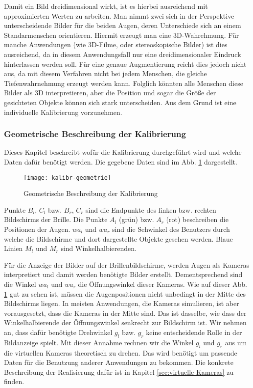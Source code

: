 Damit ein Bild dreidimensional wirkt, ist es hierbei ausreichend mit approximierten Werten zu arbeiten.
Man nimmt zwei sich in der Perspektive unterscheidende Bilder für die beiden Augen, deren Unterschiede sich an einem Standarmenschen orientieren. 
Hiermit erzeugt man eine 3D-Wahrehmung. 
Für manche Anwendungen (wie 3D-Filme, oder stereoskopische Bilder) ist dies ausreichend, da in diesem Anwendungsfall nur eine dreidimensionaler Eindruck hinterlassen werden soll. 
Für eine genaue Augmentierung reicht dies jedoch nicht aus, da mit diesem Verfahren nicht bei jedem Menschen, die gleiche Tiefenwahrnehmung erzeugt werden kann.
Folglich könnten alle Menschen diese Bilder als 3D interpretieren, aber die Position und sogar die Größe der gesichteten Objekte können sich stark unterscheiden. 
Aus dem Grund ist eine individuelle Kalibrierung vorzunehmen.


\subsubsection{Geometrische Beschreibung der Kalibrierung}
\label{sec:Geometrische Beschreibung der Kalibrierung}
Dieses Kapitel beschreibt wofür die Kalibrierung durchgeführt wird und welche Daten dafür benötigt werden.
Die gegebene Daten sind im Abb. \ref{fig:geom} dargestellt. 

\begin{figure}[h]
   \centering
   \texttt{[image: kalibr-geometrie]}
   \caption{Geometrische Beschreibung der Kalibrierung}
   \label{fig:geom}
\end{figure}

Punkte $B_{l}$, $C_{l}$ bzw. $B_{r}$, $C_{r}$ sind die Endpunkte des linken bzw. rechten Bildschirms der Brille.
Die Punkte $A_{l}$ (grün) bzw. $A_{r}$ (rot) beschreiben die Positionen der Augen.
$wa_{l}$ und $wa_{r}$ sind die Sehwinkel des Benutzers durch welche die Bildschirme und dort dargestellte Objekte gesehen werden. 
Blaue Linien $M_{l}$ und $M_{r}$ sind Winkelhalbierenden.

Für die Anzeige der Bilder auf der Brillenbildschirme, werden Augen als Kameras interpretiert und damit werden benötigte Bilder erstellt.
Dementsprechend sind die Winkel $wa_{l}$ und $wa_{r}$ die Öffnungswinkel dieser Kameras.
Wie auf dieser Abb. \ref{fig:geom} gut zu sehen ist, müssen die Augenpositionen nicht unbedingt in der Mitte des Bildschirms liegen.
In meisten Anwendungen, die Kameras simulieren, ist aber vorausgesetzt, dass die Kameras in der Mitte sind.
Das ist dasselbe, wie dass der Winkelhalbierende der Öffnungswinkel senkrecht zur Bildschirm ist.
Wir nehmen an, dass dafür benötigte Drehwinkel $g_{l}$ bzw. $g_{r}$ keine entscheidende Rolle in der Bildanzeige spielt.
Mit dieser Annahme rechnen wir die Winkel $g_{l}$ und  $g_{r}$ aus  um die virtuellen Kameras theoretisch zu drehen.
Das wird benötigt um passende Daten für die Benutzung anderer Anwendungen zu bekommen. Die konkrete Beschreibung der Realisierung dafür ist in Kapitel  \ref{sec:virtuelle Kameras} zu finden.


